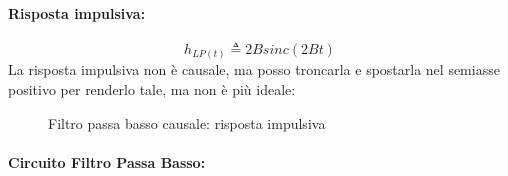             \paragraph{Risposta impulsiva:}
            \[
                h_{LP(t)}\triangleq 2Bsinc(2Bt)  
            \]
            La risposta impulsiva non è causale, ma posso troncarla e spostarla nel semiasse positivo per renderlo tale, ma non è più ideale:
            \begin{figure}[H]
                \centering


                \caption{Filtro passa basso causale: risposta impulsiva}
                \label{fig:filtro passa basso ideale causale}
            \end{figure} 

            \paragraph{Circuito Filtro Passa Basso:}
            
